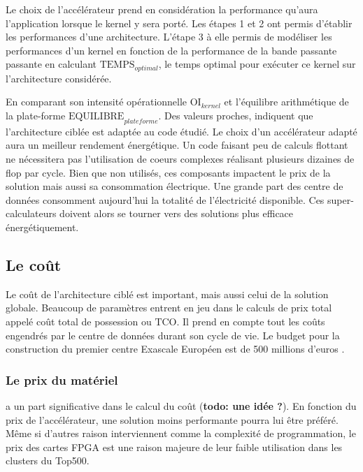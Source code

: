 Le choix de l'accélérateur prend en considération la performance qu'aura l'application lorsque le kernel y sera porté. Les étapes 1 et 2 ont permis d'établir les performances d'une architecture. L'étape 3 à elle permis de modéliser les performances d'un kernel en fonction de la performance de la bande passante passante en calculant $\text{TEMPS}_{optimal}$, le temps optimal pour exécuter ce kernel sur l'architecture considérée.

En comparant son intensité opérationnelle  $\text{OI}_{kernel}$ et l'équilibre arithmétique de la plate-forme $\text{EQUILIBRE}_{plateforme}$. Des valeurs proches, indiquent que l'architecture ciblée est adaptée au code étudié. Le choix d'un accélérateur adapté aura un meilleur rendement énergétique. Un code faisant peu de calculs flottant ne nécessitera pas l'utilisation de coeurs complexes réalisant plusieurs dizaines de flop par cycle. Bien que non utilisés, ces composants impactent le prix de la solution mais aussi sa consommation électrique. Une grande part des centre de données consomment aujourd'hui la totalité de l'électricité disponible. Ces super-calculateurs doivent alors se tourner vers des solutions plus efficace énergétiquement.



\subsection{Le coût}

Le coût de l'architecture ciblé est important, mais aussi celui de la solution globale. Beaucoup de paramètres entrent en jeu dans le calculs de prix total appelé coût total de possession ou $\text{TCO}$. Il prend en compte tout les coûts engendrés par le centre de données durant son cycle de vie. Le budget pour la construction du premier centre Exascale Européen est de 500 millions d'euros \cite{SergiGirona2018}.

\subsubsection{Le prix du matériel} a un part significative dans le calcul du coût (\textbf{todo: une idée ?}). En fonction du prix de l'accélérateur, une solution moins performante pourra lui être préféré. Même si d'autres raison interviennent comme la complexité de programmation, le prix des cartes FPGA est une raison majeure de leur faible utilisation dans les clusters du Top500.

